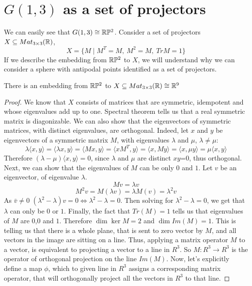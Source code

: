 \documentclass[11pt,a4paper]{report}
\begin{document}
\section{$G(1,3)$ as a set of projectors}\label{g13proj}
We can easily see that $G(1,3) \cong \mathbb{R}\mathbb{P}^2$.
Consider a set of projectors $X \subseteq Mat_{3 \times 3}(\mathbb{R})$,
$$ X = \{ M \mid M^T = M, \: M^2 = M,\: Tr M = 1 \}$$
If we describe the embedding from $\mathbb{R} \mathbb{P}^2$ to $X$, we will understand why we can consider a sphere with antipodal points identified as a set of projectors.
\begin{Prop}
    There is an embedding from $\mathbb{R} \mathbb{P}^2$ to $X \subseteq Mat_{3 \times 3}(\mathbb{R}) \cong \mathbb{R}^9$ 
\end{Prop}
\begin{proof}
We know that $X$ consists of matrices that are symmetric, idempotent and whose eigenvalues add up to one.
Spectral theorem tells us that a real symmetric matrix is diagonizable.
We can also show that the eigenvectors of symmetric matrices, with distinct eigenvalues, are orthogonal.
Indeed, let $x$ and $y$ be eigenvectors of a symmetric matrix $M$, with eigenvalues $\lambda$ and $\mu$, $\lambda \neq \mu$:
$$ \lambda \langle x,y \rangle = \langle \lambda x,  y \rangle = \langle M x, y \rangle = \langle x M^T, y \rangle = \langle x, M y \rangle = \langle x, \mu y \rangle = \mu \langle x, y \rangle  $$
Therefore $(\lambda - \mu) \langle x , y \rangle = 0$, since $\lambda$ and $\mu$ are distinct $xy$=0, thus orthogonal.
\noindent  Next, we can show that the eigenvalues of $M$ can be only $0$ and $1$.
Let $v$ be an eigenvector, of eigenvalue $\lambda$.
$$ M v = \lambda v $$
$$ M^2 v = M (\lambda v) = \lambda M (v) = \lambda^2 v $$
As $\bar{v} \neq 0$ $(\lambda^2 - \lambda) v = 0 \iff \lambda^2 - \lambda = 0$.
Then solving for $\lambda^2-\lambda = 0$, we get that $\lambda$ can only be $0$ or $1$.
Finally, the fact that $Tr(M)=1$ tells us that eigenvalues of $M$ are $0$,$0$ and $1$.
Therefore $\dim \ker M = 2$ and $ \dim Im(M) = 1 $. This is telling us that there is a whole plane,
that is sent to zero vector by $M$, and all vectors in the image are sitting on a line.
\newline
Thus, applying a matrix operator $M$ to a vector,
is equivalent to projecting a vector to a line in $R^3$.
So $M :R^3 \to R^3$ is the operator of orthogonal projection on the line $Im(M)$.
\newline
Now, let's explicitly define a map $\phi$, which to given line in $R^3$ assigns a corresponding matrix operator,
that will orthogonally project all the vectors in $R^3$ to that line.

\end{proof}
\end{document}

